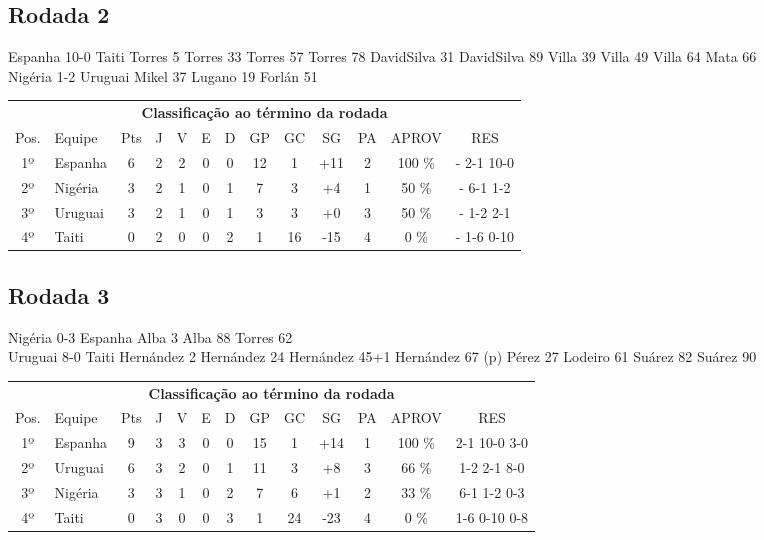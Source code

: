 \documentclass{article}
\begin{document}
\subsection*{Rodada 2}
Espanha 10-0 Taiti
Torres 5
Torres 33
Torres 57
Torres 78
DavidSilva 31
DavidSilva 89
Villa 39
Villa 49
Villa 64
Mata 66
\\
Nigéria 1-2 Uruguai
Mikel 37
Lugano 19
Forlán 51
\\
\begin{center}
\begin{tabular}{| c | l | c | c | c | c | c | c | c | c | c | c | c |}
\multicolumn{13}{c}{\textbf{Classificação ao término da rodada}}\\
Pos.&Equipe&Pts&J&V&E&D&GP&GC&SG&PA&APROV&RES\\
1º&Espanha             &6&2	&2&0&0	&12&1&+11	&2&100 \%	& - 2-1 10-0 \\
2º&Nigéria             &3&2	&1&0&1	&7&3&+4	&1& 50 \%	& - 6-1 1-2 \\
3º&Uruguai             &3&2	&1&0&1	&3&3&+0	&3& 50 \%	& - 1-2 2-1 \\
4º&Taiti               &0&2	&0&0&2	&1&16&-15	&4&  0 \%	& - 1-6 0-10 \\
\end{tabular}
\end{center}


\subsection*{Rodada 3}
Nigéria 0-3 Espanha
Alba 3
Alba 88
Torres 62
\\
Uruguai 8-0 Taiti
Hernández 2
Hernández 24
Hernández 45+1
Hernández 67 (p)
Pérez 27
Lodeiro 61
Suárez 82
Suárez 90
\\
\begin{center}
\begin{tabular}{| c | l | c | c | c | c | c | c | c | c | c | c | c |}
\multicolumn{13}{c}{\textbf{Classificação ao término da rodada}}\\
Pos.&Equipe&Pts&J&V&E&D&GP&GC&SG&PA&APROV&RES\\
1º&Espanha             &9&3	&3&0&0	&15&1&+14	&1&100 \%	&2-1 10-0 3-0 \\
2º&Uruguai             &6&3	&2&0&1	&11&3&+8	&3& 66 \%	&1-2 2-1 8-0 \\
3º&Nigéria             &3&3	&1&0&2	&7&6&+1	&2& 33 \%	&6-1 1-2 0-3 \\
4º&Taiti               &0&3	&0&0&3	&1&24&-23	&4&  0 \%	&1-6 0-10 0-8 \\
\end{tabular}
\end{center}
\end{document}
